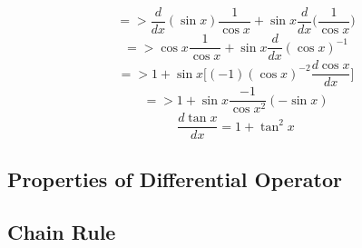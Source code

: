 	\begin{displaymath}
	=>\frac{d}{dx}(\sin x)\frac{1}{\cos x}+\sin x \frac{d}{dx}\bigg(\frac{1}{\cos x}\bigg)
	\end{displaymath}
	\begin{displaymath}
	=>\cos x \frac{1}{\cos x}+\sin x\frac{d}{dx}(\cos x)^{-1}
	\end{displaymath}
	\begin{displaymath}
	=> 1+\sin x\bigg[(-1)(\cos x)^{-2}\frac{d\cos x}{dx}\bigg]
	\end{displaymath}
	\begin{displaymath}
	=> 1+\sin x\frac{-1}{\cos x^2}(-\sin x)
	\end{displaymath}
	\begin{equation}
	\frac{d \tan x}{dx} = 1 + \tan^2 x
	\end{equation}

	\subsection{Properties of Differential Operator}
	\subsection{Chain Rule}
	
